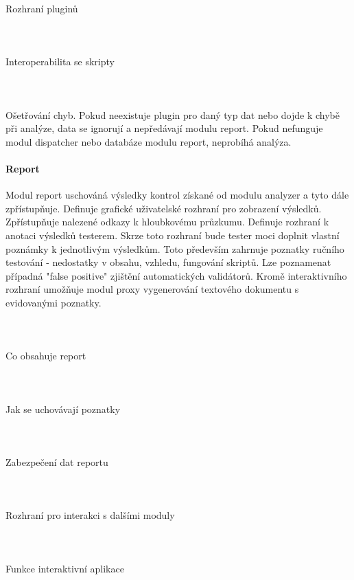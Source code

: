 \documentclass[10pt]{article}
\begin{document}
	\paragraph{~}Rozhraní pluginů
	\paragraph{~}Interoperabilita se skripty
	\paragraph{~}Ošetřování chyb. Pokud neexistuje plugin pro daný typ dat nebo dojde k chybě při analýze, data se ignorují a nepředávají modulu report. Pokud nefunguje modul dispatcher nebo databáze modulu report, neprobíhá analýza.
	\paragraph{Report} Modul report uschováná výsledky kontrol získané od modulu analyzer a tyto dále zpřístupňuje. Definuje grafické uživatelské rozhraní pro zobrazení výsledků. Zpřístupňuje nalezené odkazy k hloubkovému průzkumu. Definuje rozhraní k anotaci výsledků testerem. Skrze toto rozhraní bude tester moci doplnit vlastní poznámky k jednotlivým výsledkům. Toto především zahrnuje poznatky ručního testování - nedostatky v obsahu, vzhledu, fungování skriptů. Lze poznamenat případná "false positive" zjištění automatických validátorů. Kromě interaktivního rozhraní umožňuje modul proxy vygenerování textového dokumentu s evidovanými poznatky. 
	\paragraph{~}Co obsahuje report
	\paragraph{~}Jak se uchovávají poznatky
	\paragraph{~}Zabezpečení dat reportu
	\paragraph{~}Rozhraní pro interakci s dalšími moduly
	\paragraph{~}Funkce interaktivní aplikace
\end{document}
